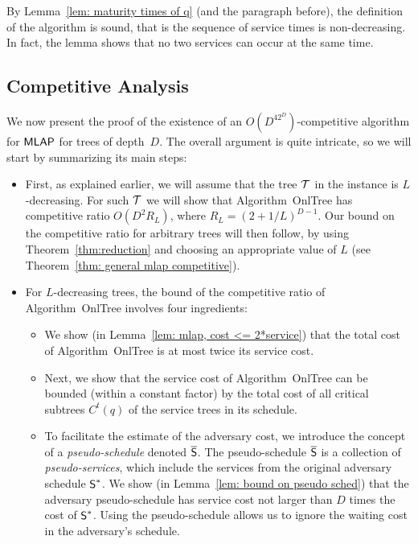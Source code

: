 \documentclass[a4paper]{article}
\newcommand{\calT}{{\cal T}}
\newcommand{\OnAlgTreesGeneral}{{\sc OnlTree}}
\newcommand{\MLAP}{\mbox{\rm\textsf{MLAP}}}
\newcommand{\optschedS}{\mbox{\rm\textsf{S}}^\ast}
\newcommand{\pseudoschedS}{\overline{\mbox{\rm\textsf{S}}}}
\begin{document}
By Lemma~\ref{lem: maturity times of q} (and the paragraph before),
the definition of the algorithm is sound, that is the sequence of
service times is non-decreasing. In fact, the lemma
shows that no two services can occur at the same time.
 

\subsection{Competitive Analysis}

We now present the proof of the existence of an
$O(D^42^D)$-competitive algorithm for $\MLAP$ for
trees of depth~$D$. The overall argument is quite intricate, so we 
will start by summarizing its main steps:

\begin{itemize}

\item First, as explained earlier, we will assume that the tree
$\calT$ in the instance is $L$-decreasing. 
For such $\calT$ we will show that Algorithm~{\OnAlgTreesGeneral}
has competitive ratio $O(D^2R_L)$, where
$R_L = (2+1/L)^{D-1}$. Our bound on the competitive ratio for
arbitrary trees will then follow, by using Theorem~\ref{thm:reduction}
and choosing an appropriate value of $L$ (see Theorem~\ref{thm: general mlap competitive}).

\item For $L$-decreasing trees,
	the bound of the competitive ratio of Algorithm~{\OnAlgTreesGeneral}
	involves four ingredients:
	
	\begin{itemize}
		
		\item We show (in Lemma~\ref{lem: mlap, cost <= 2*service})
		that the total cost of Algorithm~{\OnAlgTreesGeneral}
			is at most twice its service cost.
			
		\item Next, we show that the service cost of
			Algorithm~{\OnAlgTreesGeneral} can be bounded 
			(within a constant factor) by the total cost of all
			critical subtrees $C^t(q)$ of the service trees in its schedule.
			
		\item To facilitate the estimate of the adversary cost, 
			we introduce the concept of a \emph{pseudo-schedule}
			denoted $\pseudoschedS$. The pseudo-schedule
                        $\pseudoschedS$ is a collection of 
			\emph{pseudo-services}, which include the services
			from the original adversary schedule $\optschedS$.
			We show (in Lemma~\ref{lem: bound on pseudo sched})
			that the adversary pseudo-schedule has service
			cost not larger than $D$ times the cost of $\optschedS$.
			Using the pseudo-schedule allows us to ignore the waiting cost in the
			adversary's schedule.
			

\end{itemize}
\end{itemize}
\end{document}
